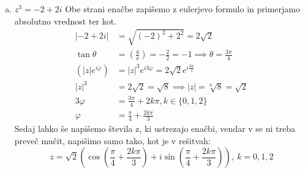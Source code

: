 \documentclass[12pt,a4paper,slovene]{article}
\begin{document}
\begin{enumerate}[(1)]
    \begin{enumerate}[(a)]
        \item $z^3 = -2 + 2i$
        Obe strani enačbe zapišemo z eulerjevo formulo in primerjamo absolutno vrednost ter kot.
        \begin{align*}
            |-2 + 2i| &= \sqrt{(-2)^2 + 2^2} = 2\sqrt{2}\\
            \tan \theta &= \left(\frac{y}{x}\right) = -\frac{2}{2} = -1 \implies \theta = \frac{3\pi}{4}\\
            \left(|z| e^{i \varphi}\right) &= |z|^3 e^{i 3\varphi} = 2\sqrt{2} e^{i\frac{3\pi}{4}}\\
            |z|^3 &= 2\sqrt{2} = \sqrt{8} \implies |z| = \sqrt[6]{8} = \sqrt{2}\\
            3\varphi &= \frac{3\pi}{4} + 2k\pi, k \in \{0, 1, 2\}\\
            \varphi &= \frac{\pi}{4} + \frac{2 k \pi}{3}              
        \end{align*}
        Sedaj lahko še napišemo števila z, ki ustrezajo enačbi, vendar v se ni treba preveč mučit, napišimo samo tako, kot je v rešitvah:
        \[
        z = \sqrt{2}(\cos(\frac{\pi}{4} + \frac{2k\pi}{3}) + i \sin(\frac{\pi}{4} + \frac{2k\pi}{3})),\ k = 0, 1, 2
        \]
        

\end{enumerate}
\end{enumerate}
\end{document}
